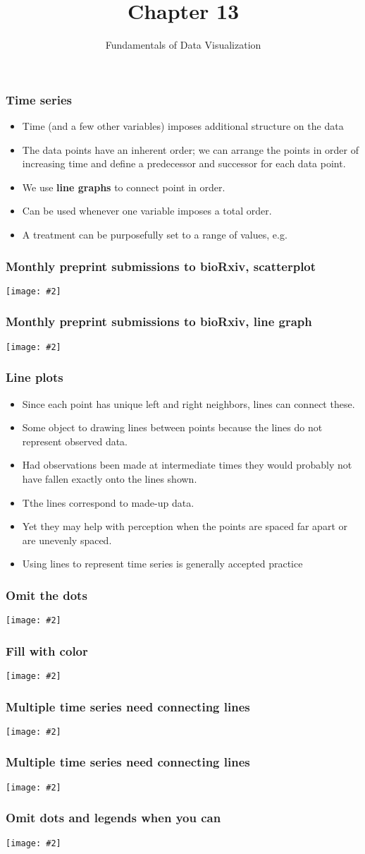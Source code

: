 \documentclass{beamer}
\author{Fundamentals of Data Visualization}
\title{Chapter 13}
\newcommand{\bi}{\begin{itemize}}
\newcommand{\li}{\item}
\newcommand{\ei}{\end{itemize}}
\newcommand{\fig}[2]{\centerline{\texttt{[image: \#2]}}}
\newcommand{\bfr}[1]{\begin{frame}[fragile]\frametitle{{ #1 }}}
\begin{document}
\begin{frame}
\maketitle
\end{frame}

\bfr{Time series}
\bi
\li Time (and a few other variables) imposes additional structure on the data
\li  The data points have an inherent order; we can arrange the points in order of increasing time and define a predecessor and successor for each data point.
\li We use {\bf line graphs} to connect point in order.
\li Can be used whenever one variable imposes a total order.
\li A treatment can be purposefully set to a range of values, e.g.

\ei
\end{frame}

\bfr{Monthly preprint submissions to bioRxiv, scatterplot}
\fig{1}{biorxiv-dots-1.png}
\end{frame}

\bfr{Monthly preprint submissions to bioRxiv, line graph}
\fig{1}{biorxiv-dots-line-1.png}
\end{frame}

\bfr{Line plots}
\bi
\li Since each point has unique left and right neighbors, lines can connect these.
\li Some  object to drawing lines between points because the lines do not represent observed data.
\li Had observations been made at intermediate times they would probably not have fallen exactly onto the lines shown.
\li Tthe lines correspond to made-up data. 
\li Yet they may help with perception when the points are spaced far apart or are unevenly spaced.
\li Using lines to represent time series is generally accepted practice
\ei
\end{frame}

\bfr{Omit the dots}
\fig{1}{biorxiv-line-1.png}
\end{frame}

\bfr{Fill with color}
\fig{1}{biorxiv-line-area-1.png}
\end{frame}

\bfr{Multiple time series need connecting lines}
\fig{1}{bio-preprints-dots-1.png}
\end{frame}

\bfr{Multiple time series need connecting lines}
\fig{1}{bio-preprints-lines-1.png}
\end{frame}

\bfr{Omit dots and legends when you can}
\fig{1}{bio-preprints-direct-label-1.png}
\end{frame}
\end{document}
